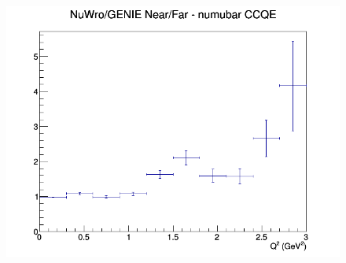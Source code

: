 \documentclass[12pt]{article}
\begin{document}
\begin{figure}[h]
\endminipage
{}
\includegraphics[width=\linewidth]{eff_Q2/LAr/ratios/CCQE_NuWro_GENIE_numubar_NF_Q2.png}
\endminipage
\newline
\end{figure}
\clearpage
\end{document}
